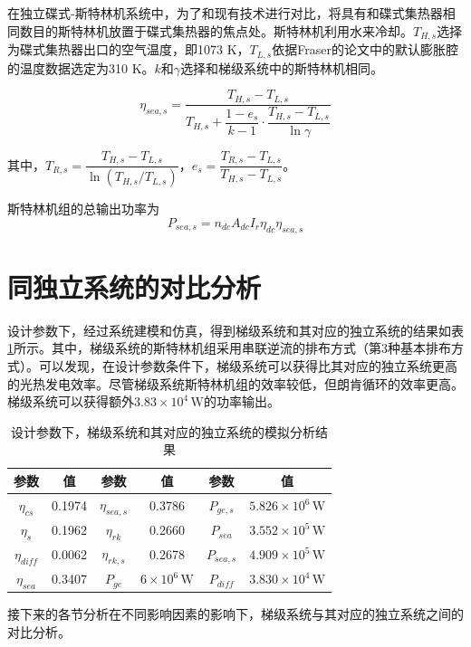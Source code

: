 在独立碟式-斯特林机系统中，为了和现有技术进行对比，将具有和碟式集热器相同数目的斯特林机放置于碟式集热器的焦点处。斯特林机利用水来冷却。$T_{H,s}$选择为碟式集热器出口的空气温度，即1073 K，$T_{L,s}$依据Fraser的论文\cite{Fraser2008}中的默认膨胀腔的温度数据选定为310 K。$k$和$\gamma$选择和梯级系统中的斯特林机相同。

\begin{equation}
	\eta_{sea,s}=\dfrac{T_{H,s}-T_{L,s}}{T_{H,s}+\dfrac{1-e_{s}}{k-1}\cdot\dfrac{T_{H,s}-T_{L,s}}{\ln\gamma}}
\end{equation}

其中，$T_{R,s}=\dfrac{T_{H,s}-T_{L,s}}{\ln(T_{H,s}/T_{L,s})}$，$e_{s}=\dfrac{T_{R,s}-T_{L,s}}{T_{H,s}-T_{L,s}}$。

斯特林机组的总输出功率为
\begin{equation}
	P_{sea,s}=n_{dc}A_{dc}I_r\eta_{dc}\eta_{sea,s}
\end{equation}

\section{同独立系统的对比分析}

设计参数下，经过系统建模和仿真，得到梯级系统和其对应的独立系统的结果如表\ref{tab:importantResults}所示。其中，梯级系统的斯特林机组采用串联逆流的排布方式（第3种基本排布方式）。可以发现，在设计参数条件下，梯级系统可以获得比其对应的独立系统更高的光热发电效率。尽管梯级系统斯特林机组的效率较低，但朗肯循环的效率更高。梯级系统可以获得额外$3.83\times10^4\,\mathrm{W}$的功率输出。

\begin{table}[htbp]
	\caption{设计参数下，梯级系统和其对应的独立系统的模拟分析结果}
	\begin{center}
	\begin{tabular}{cccccc}
		\toprule
		参数		&	值	&	参数		&	值	&	参数		&	值\\
		\midrule
		$\eta_{cs}$		&	0.1974	&	$\eta_{sea,s}$	&	0.3786	&	$P_{ge,s}$	&	$5.826\times10^6\,\mathrm{W}$\\
		$\eta_{s}$	&	0.1962	&	$\eta_{rk}$	&	0.2660	&	$P_{sea}$		&	$3.552\times10^5\,\mathrm{W}$\\
		$\eta_{diff}$		&	0.0062	&	$\eta_{rk,s}$	&	0.2678	&	$P_{sea,s}$	&	$4.909\times10^5\,\mathrm{W}$\\
		$\eta_{sea}$	&	0.3407	&	$P_{ge}$		&	$6\times10^6\,\mathrm{W}$	&	$P_{diff}$		&	$3.830\times10^4\,\mathrm{W}$\\
		\bottomrule
	\end{tabular}
	\end{center}
	\label{tab:importantResults}
\end{table}
接下来的各节分析在不同影响因素的影响下，梯级系统与其对应的独立系统之间的对比分析。
